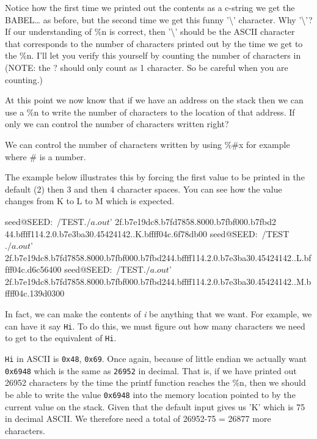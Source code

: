  
 
Notice how the first time we printed out the contents as a c-string we get the BABEL… as before, but the second time we get this funny '\textbackslash' character. Why '\textbackslash'? If our understanding of \%n is correct, then '\textbackslash' should be the ASCII character that corresponds to the number of characters printed out by the time we get to the \%n. I’ll let you verify this yourself by counting the number of characters in  (NOTE: the ? should only count as 1 character. So be careful when you are counting.) 
 
At this point we now know that if we have an address on the stack then we can use a \%n to write the number of characters to the location of that address. If only we can control the number of characters written right? 
 
We can control the number of characters written by using \%\#x for example where \# is a number. 
 
The example below illustrates this by forcing the first value to be printed in the default (2) then 3 and then 4 character spaces. You can see how the value changes from K to L to M which is expected. 
\begin{code} 
seed@SEED:~/TEST$ ./a.out $'%
2f.b7e19dc8.b7fd7858.8000.b7fbf000.b7fbd2 44.bffff114.2.0.b7e3ba30.45424142..K.bffff04c.6f78db00 
seed@SEED:~/TEST$ ./a.out $'%
2f.b7e19dc8.b7fd7858.8000.b7fbf000.b7fbd244.bffff114.2.0.b7e3ba30.45424142..L.bffff04c.d6c56400 
seed@SEED:~/TEST$ ./a.out $'%
2f.b7e19dc8.b7fd7858.8000.b7fbf000.b7fbd244.bffff114.2.0.b7e3ba30.45424142..M.bffff04c.139d0300 
\end{code} 

In fact, we can make the contents of {\em i} be anything that we want. For example, we can have it say {\tt Hi}. To do this, we must figure out how many characters we need to get to the equivalent of {\tt Hi}. 
 
{\tt Hi} in ASCII is {\tt 0x48}, {\tt 0x69}. Once again, because of little endian we actually want {\tt 0x6948} which is the same as {\tt 26952} in decimal. That is, if we have printed out 26952 characters by the time the printf function reaches the \%n, then we should be able to write the value {\tt 0x6948} into the memory location pointed to by the current value on the stack. Given that the default input gives us 'K' which is 75 in decimal ASCII. We therefore need a total of 26952-75 = 26877 more characters.  
 
